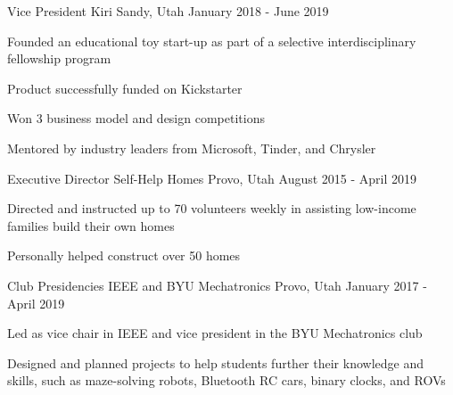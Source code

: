 

\begin{cventries}

  \cventry
    {Vice President}
    {Kiri}
    {Sandy, Utah}
    {January 2018 - June 2019}
    {
      \begin{cvitems}
      	\item Founded an educational toy start-up as part of a selective interdisciplinary fellowship program
      	\item Product successfully funded on Kickstarter
      	\item Won 3 business model and design competitions
      	\item Mentored by industry leaders from Microsoft, Tinder, and Chrysler
      \end{cvitems}
    }
    
  \cventry
    {Executive Director} %
    {Self-Help Homes} %
    {Provo, Utah} %
    {August 2015 - April 2019} %
    {
      \begin{cvitems}
      	\item Directed and instructed up to 70 volunteers weekly in assisting low-income families build their own homes
      	\item Personally helped construct over 50 homes
      \end{cvitems}
    }
    

    
    \cventry
    {Club Presidencies}
    {IEEE and BYU Mechatronics}
    {Provo, Utah}
    {January 2017 - April 2019}
    {
      \begin{cvitems}
        \item Led as vice chair in IEEE and vice president in the BYU Mechatronics club
        \item Designed and planned projects to help students further their knowledge and skills, such as maze-solving robots, Bluetooth RC cars, binary clocks, and ROVs
      \end{cvitems}
    }


\end{cventries}
